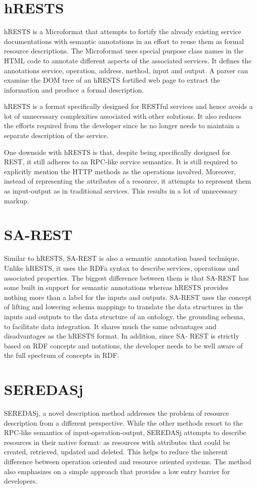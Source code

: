 \begin{spacing}{1.5}
\section{hRESTS} 
hRESTS\cite{12} is a Microformat that attempts to fortify the already existing service documentations with semantic annotations in an effort to reuse them as formal resource descriptions. The Microformat uses special purpose class names in the HTML code to annotate different aspects of the associated services. It defines the annotations service, operation, address, method, input and output. A parser can examine the DOM tree of an hRESTS fortified web page to extract the information and produce a formal description. 

hRESTS is a format specifically designed for RESTful services and hence avoids a lot of unnecessary complexities associated with other solutions. It also reduces the efforts required from the developer since he no longer needs to  maintain a separate description of the service.   

One downside with hRESTS is that, despite being specifically designed for REST, it still adheres to an RPC-like service semantics. It is still required to explicitly mention the HTTP methods as the operations involved. Moreover, instead of representing the attributes of a resource, it attempts to represent them as input-output as in traditional services. This results in a lot of unnecessary markup.

\section{SA-REST}

Similar to hRESTS, SA-REST\cite{13} is also a semantic annotation based technique. Unlike hRESTS, it uses the RDFa syntax to describe services, operations and associated properties. The biggest difference between them is that SA-REST has some built in support for semantic annotations whereas hRESTS provides nothing more than a label for the inputs and outputs. SA-REST uses the concept of lifting and lowering schema mappings to translate the data structures in the inputs and outputs to the data structure of an ontology, the grounding schema, to facilitate data integration. It shares much the same advantages and disadvantages as the hRESTS format. In addition, since SA- REST is strictly based on RDF concepts and notations, the developer needs to be well aware of the full spectrum of concepts in RDF.

\section{SEREDASj} 
SEREDASj\cite{14}, a novel description method addresses the problem of resource description from a different perspective. While the other methods resort to the RPC-like semantics of input-operation-output, SEREDASj attempts to describe resources in their native format: as resources with attributes that could be created, retrieved, updated and deleted. This helps to reduce the inherent difference between operation oriented and resource oriented systems. The method also emphasizes on a simple approach that provides a low entry  barrier for developers.


\end{spacing}

